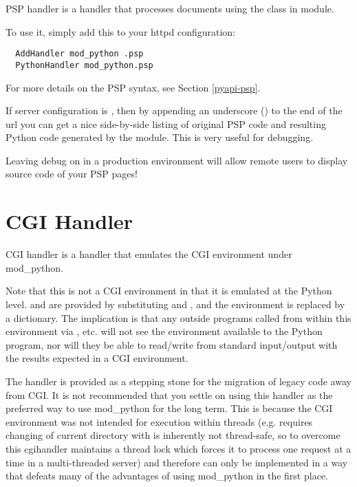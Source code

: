 PSP handler is a handler that processes documents using the
 class in  module.

To use it, simply add this to your httpd configuration: 

\begin{verbatim}
  AddHandler mod_python .psp
  PythonHandler mod_python.psp
\end{verbatim}

For more details on the PSP syntax, see Section \ref{pyapi-psp}.

If  server configuration is , then by
appending an underscore (\samp{_}) to the end of the url you can get a
nice side-by-side listing of original PSP code and resulting Python
code generated by the  module. This is very useful for
debugging.

\begin{notice}
Leaving debug on in a production environment will allow remote users
to display source code of your PSP pages!
\end{notice}

\section{CGI Handler\label{hand-cgi}}


CGI handler is a handler that emulates the CGI environment under mod_python. 

Note that this is not a  CGI environment in that it is
emulated at the Python level.  and  are
provided by substituting  and , and
the environment is replaced by a dictionary. The implication is that
any outside programs called from within this environment via
, etc. will not see the environment available to the
Python program, nor will they be able to read/write from standard
input/output with the results expected in a  CGI environment.

The handler is provided as a stepping stone for the migration of
legacy code away from CGI. It is not recommended that you settle on
using this handler as the preferred way to use mod_python for the long
term. This is because the CGI environment was not intended for
execution within threads (e.g. requires changing of current directory
with is inherently not thread-safe, so to overcome this cgihandler
maintains a thread lock which forces it to process one request at a
time in a multi-threaded server) and therefore can only be implemented
in a way that defeats many of the advantages of using mod_python in
the first place.

